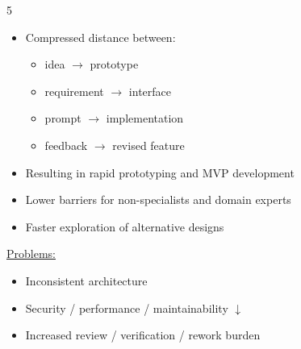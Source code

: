 \documentclass[landscape,a4paper]{extarticle}
\begin{document}
\begin{multicols*}{5}
    \begin{itemize}
        \item Compressed distance between:
        \begin{itemize}
            \item idea $\rightarrow$ prototype
            \item requirement $\rightarrow$ interface
            \item prompt $\rightarrow$ implementation
            \item feedback $\rightarrow$ revised feature
        \end{itemize}
        \item Resulting in rapid prototyping and MVP development
        \item Lower barriers for non-specialists and domain experts
        \item Faster exploration of alternative designs
    \end{itemize}

    \uline{Problems:}

    \begin{itemize}
        \item Inconsistent architecture
        \item Security / performance / maintainability $\downarrow$
        \item Increased review / verification / rework burden
    \end{itemize}


\end{multicols*}
\end{document}
